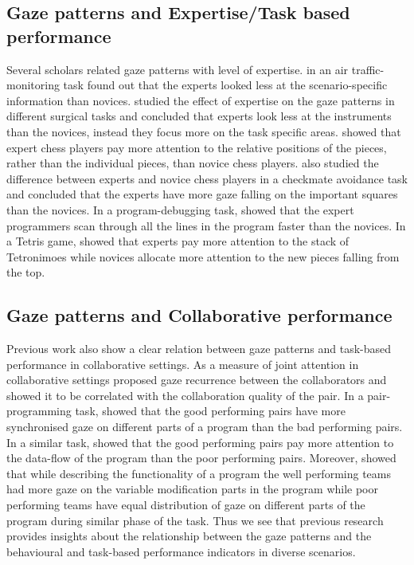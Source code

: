 \documentclass{sig-alternate}
\begin{document}
\subsection{Gaze patterns and Expertise/Task based performance}

Several scholars related gaze patterns with level of expertise.
\cite{hasse2012measure} in an air traffic-monitoring task found out that the
experts looked less at the scenario-specific information than novices.
\cite{eivazi2012gaze, law2004eye, tien2010measuring} studied the effect of
expertise on the gaze patterns in different surgical tasks and concluded that
experts look less at the instruments than the novices, instead they focus more
on the task specific areas. \cite{reingold2001visual} showed that expert chess
players pay more attention to the relative positions of the pieces, rather than
the individual pieces, than novice chess players. \cite{blignaut2008visual} also
studied the difference between experts and novice chess players in a checkmate
avoidance task and concluded that the experts have more gaze falling on the
important squares than the novices. In a program-debugging task,
\cite{sharif2012eye} showed that the expert programmers scan through all the
lines in the program faster than the novices. In a Tetris game,
\cite{jermann2010using} showed that experts pay more attention to the stack of
Tetronimoes while novices allocate more attention to the new pieces falling from
the top.

\subsection{Gaze patterns and Collaborative performance}

Previous work also show a clear relation between gaze patterns and
task-based performance in collaborative settings. As a measure of joint attention in collaborative settings  \cite{richardson2007art} proposed gaze recurrence between the collaborators and showed it to be correlated with the collaboration quality of the pair. In a pair-programming task, \cite{jermann2012effects} showed that the good performing pairs have more synchronised gaze on different parts of a program than the bad performing pairs. In a similar task, \cite{sharma2012gaze} showed that the good performing pairs pay more attention to the data-flow of the program than the poor performing pairs. Moreover, \cite{sharma2013understanding} showed that while describing the functionality of a program the well performing teams had more gaze on the variable modification parts in the program while poor performing teams have equal distribution of gaze on different parts of the program during similar phase of the task.  Thus we see that previous research provides insights about the relationship between the gaze patterns and the behavioural and task-based performance indicators in diverse scenarios.
\end{document}
